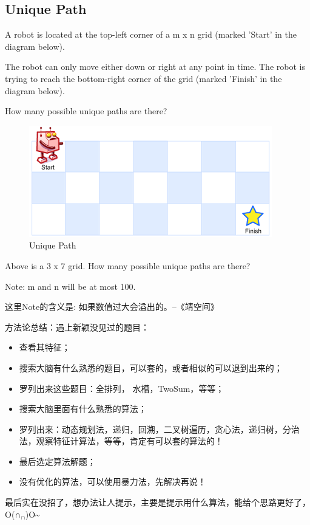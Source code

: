 \documentclass[12pt]{book}
\begin{document}
\subsection{Unique Path}
\label{sec-14-2-1}
A robot is located at the top-left corner of a m x n grid (marked 'Start' in the diagram below).

The robot can only move either down or right at any point in time. The robot is trying to reach the bottom-right corner of the grid (marked 'Finish' in the diagram below).

How many possible unique paths are there?
\begin{figure}[htb]
\centering
\includegraphics[width=.9\linewidth]{./pic/uniquePaths.png}
\caption{Unique Path}
\end{figure}

Above is a 3 x 7 grid. How many possible unique paths are there?

Note: m and n will be at most 100.

这里Note的含义是: 如果数值过大会溢出的。--《靖空间》

方法论总结：遇上新颖没见过的题目：
\begin{itemize}
\item 查看其特征；
\item 搜索大脑有什么熟悉的题目，可以套的，或者相似的可以退到出来的；
\item 罗列出来这些题目：全排列， 水槽，TwoSum，等等；
\item 搜索大脑里面有什么熟悉的算法；
\item 罗列出来：动态规划法，递归，回溯，二叉树遍历，贪心法，递归树，分治法，观察特征计算法，等等，肯定有可以套的算法的！
\item 最后选定算法解题；
\item 没有优化的算法，可以使用暴力法，先解决再说！
\end{itemize}

最后实在没招了，想办法让人提示，主要是提示用什么算法，能给个思路更好了，O(∩$_{\text{∩}}$)O\textasciitilde{}
\end{document}
